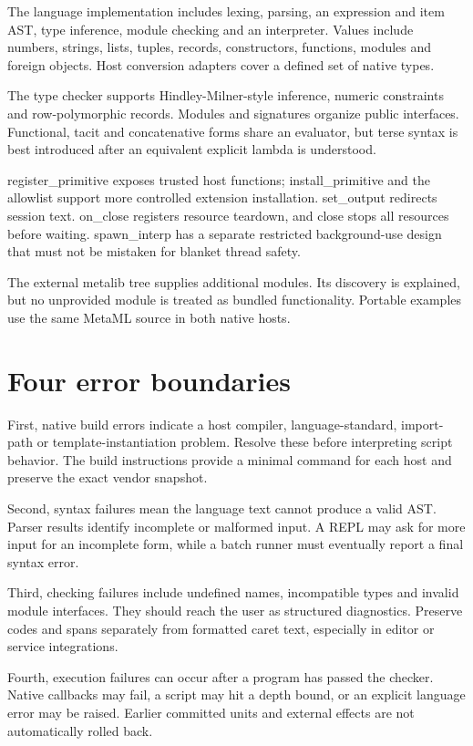 The language implementation includes lexing, parsing, an expression and item AST, type inference, module checking and an interpreter. Values include numbers, strings, lists, tuples, records, constructors, functions, modules and foreign objects. Host conversion adapters cover a defined set of native types.

The type checker supports Hindley-Milner-style inference, numeric constraints and row-polymorphic records. Modules and signatures organize public interfaces. Functional, tacit and concatenative forms share an evaluator, but terse syntax is best introduced after an equivalent explicit lambda is understood.

register\_primitive exposes trusted host functions; install\_primitive and the allowlist support more controlled extension installation. set\_output redirects session text. on\_close registers resource teardown, and close stops all resources before waiting. spawn\_interp has a separate restricted background-use design that must not be mistaken for blanket thread safety.

The external metalib tree supplies additional modules. Its discovery is explained, but no unprovided module is treated as bundled functionality. Portable examples use the same MetaML source in both native hosts.

\clearpage
\section*{Four error boundaries}
First, native build errors indicate a host compiler, language-standard, import-path or template-instantiation problem. Resolve these before interpreting script behavior. The build instructions provide a minimal command for each host and preserve the exact vendor snapshot.

Second, syntax failures mean the language text cannot produce a valid AST. Parser results identify incomplete or malformed input. A REPL may ask for more input for an incomplete form, while a batch runner must eventually report a final syntax error.

Third, checking failures include undefined names, incompatible types and invalid module interfaces. They should reach the user as structured diagnostics. Preserve codes and spans separately from formatted caret text, especially in editor or service integrations.

Fourth, execution failures can occur after a program has passed the checker. Native callbacks may fail, a script may hit a depth bound, or an explicit language error may be raised. Earlier committed units and external effects are not automatically rolled back.

